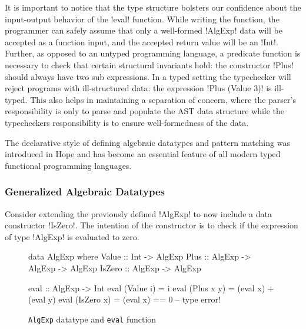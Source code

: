 \documentclass[screen,nonacm]{acmart}
\begin{document}
It is important to notice that the type structure bolsters our confidence
about the input-output behavior of the !eval! function. While writing
the function, the programmer can safely assume that only a well-formed
!AlgExp! data will be accepted as a function input, and the accepted
return value will be an !Int!. Further, as opposed to an untyped
programming language, a predicate function is necessary to check that certain
structural invariants hold: the constructor !Plus! should always have
two sub expressions. In a typed setting the typechecker will reject programs
with ill-structured data: the expression !Plus (Value 3)! is
ill-typed. This also helps in maintaining a separation of concern,
where the parser's responsibility is only to parse and populate the
AST data structure while the typecheckers responsibility is to ensure
well-formedness of the data.

The declarative style of defining algebraic datatypes and pattern matching was introduced in
Hope\cite{burstall_proving_1969, burstall_hope_1980} and has become an
essential feature of all modern typed functional programming languages.

\subsubsection{Generalized Algebraic Datatypes}
Consider extending the previously defined !AlgExp! to now
include a data constructor !IsZero!. The intention of the constructor is to
check if the expression of type !AlgExp! is evaluated to zero.

\begin{figure}[ht]
\centering
\begin{minipage}{0.5\linewidth}
\begin{CenteredBox}
\begin{code}
data AlgExp where
  Value  :: Int              -> AlgExp
  Plus   :: AlgExp -> AlgExp -> AlgExp
  IsZero :: AlgExp           -> AlgExp
\end{code}
\end{CenteredBox}
\end{minipage}%
\begin{minipage}{0.5\linewidth}
\begin{CenteredBox}
\begin{code}
eval :: AlgExp -> Int
eval (Value i) = i
eval (Plus x y) = (eval x) + (eval y)
eval (IsZero x) = (eval x) == 0 -- type error!
\end{code}
\end{CenteredBox}
\end{minipage}
\caption{\texttt{AlgExp} datatype and \texttt{eval} function}
\label{fig:algexp-eval}
\end{figure}
\end{document}
